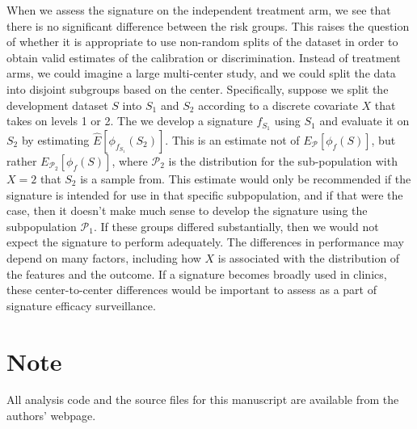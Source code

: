 \documentclass[11pt,]{article}
\begin{document}
When we assess the signature on the independent treatment arm, we see
that there is no significant difference between the risk groups. This
raises the question of whether it is appropriate to use non-random
splits of the dataset in order to obtain valid estimates of the
calibration or discrimination. Instead of treatment arms, we could
imagine a large multi-center study, and we could split the data into
disjoint subgroups based on the center. Specifically, suppose we split
the development dataset \(S\) into \(S_1\) and \(S_2\) according to a
discrete covariate \(X\) that takes on levels 1 or 2. The we develop a
signature \(f_{S_1}\) using \(S_1\) and evaluate it on \(S_2\) by
estimating \(\hat{E}[\phi_{f_{S_1}}(S_2)]\). This is an estimate not of
\(E_\mathcal{P}[\phi_f(S)]\), but rather
\(E_{\mathcal{P}_2}[\phi_f(S)]\), where \(\mathcal{P}_2\) is the
distribution for the sub-population with \(X = 2\) that \(S_2\) is a
sample from. This estimate would only be recommended if the signature is
intended for use in that specific subpopulation, and if that were the
case, then it doesn't make much sense to develop the signature using the
subpopulation \(\mathcal{P}_1\). If these groups differed substantially,
then we would not expect the signature to perform adequately. The
differences in performance may depend on many factors, including how
\(X\) is associated with the distribution of the features and the
outcome. If a signature becomes broadly used in clinics, these
center-to-center differences would be important to assess as a part of
signature efficacy surveillance.

\section{Note}\label{note}

All analysis code and the source files for this manuscript are available
from the authors' webpage.

\renewcommand\refname{References}

\end{document}
